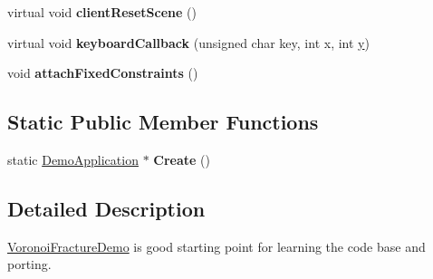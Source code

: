 \begin{DoxyCompactItemize}
\item 
\hypertarget{class_voronoi_fracture_demo_ada314cafb0b9a743c9606491de756d2b}{virtual void {\bfseries client\+Reset\+Scene} ()}\label{class_voronoi_fracture_demo_ada314cafb0b9a743c9606491de756d2b}

\item 
\hypertarget{class_voronoi_fracture_demo_a3a728e14b98dd40e77d32af29ef02526}{virtual void {\bfseries keyboard\+Callback} (unsigned char key, int x, int \hyperlink{_ice_utils_8h_aa7ffaed69623192258fb8679569ff9ba}{y})}\label{class_voronoi_fracture_demo_a3a728e14b98dd40e77d32af29ef02526}

\item 
\hypertarget{class_voronoi_fracture_demo_a62f4ebbc2fcfcc0d30e5fde99039f9e2}{void {\bfseries attach\+Fixed\+Constraints} ()}\label{class_voronoi_fracture_demo_a62f4ebbc2fcfcc0d30e5fde99039f9e2}

\end{DoxyCompactItemize}
\subsection*{Static Public Member Functions}
\begin{DoxyCompactItemize}
\item 
\hypertarget{class_voronoi_fracture_demo_a7cab9a5ae13c63576d22f2bbbcfa7547}{static \hyperlink{class_demo_application}{Demo\+Application} $\ast$ {\bfseries Create} ()}\label{class_voronoi_fracture_demo_a7cab9a5ae13c63576d22f2bbbcfa7547}

\end{DoxyCompactItemize}


\subsection{Detailed Description}
\hyperlink{class_voronoi_fracture_demo}{Voronoi\+Fracture\+Demo} is good starting point for learning the code base and porting. 


